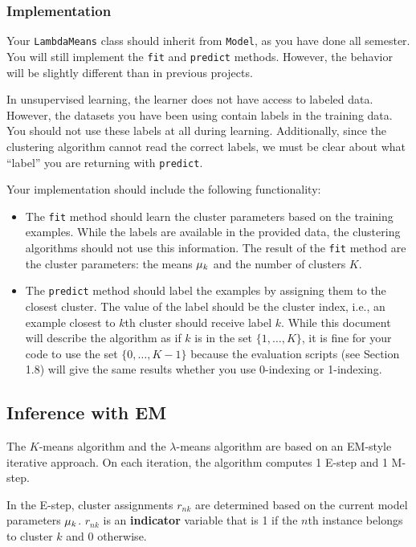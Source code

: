 \documentclass[11pt]{article}
\newcommand{\vmuk}{{\bf \mu}_k}
\newcommand{\code}[1]{{\footnotesize \tt #1}}
\begin{document}
\subsubsection{Implementation}

Your \code{LambdaMeans} class should inherit from \code{Model}, as you have done all semester. You will still implement the \code{fit} and \code{predict} methods. However, the behavior will be slightly different than in previous projects.

In unsupervised learning, the learner does not have access to labeled data. However, the datasets you have been using contain labels in the training data. You should not use these labels at all during learning. Additionally, since the clustering algorithm cannot read the correct labels, we must be clear about what ``label'' you are returning with \code{predict}.

Your implementation should include the following functionality:

\begin{itemize}
\item The \code{fit} method should learn the cluster parameters based on the training examples. While the labels are available in the provided data, the clustering algorithms should not use this information. The result of the \code{fit} method are the cluster parameters: the means $\vmuk$ and the number of clusters $K$. 
\item The \code{predict} method should label the examples by assigning them to the closest cluster.
The value of the label should be the cluster index, i.e., an example closest to $k$th cluster should receive label $k$. While this document will describe the algorithm as if $k$ is in the set $\{1,\ldots,K\}$, it is fine for your code to use the set $\{0,\ldots,K-1\}$ because the evaluation scripts (see Section 1.8) will give the same results whether you use 0-indexing or 1-indexing.
\end{itemize}

\subsection{Inference with EM}
\label{sec:EM}
The $K$-means algorithm and the $\lambda$-means algorithm are based on an EM-style iterative approach. On each iteration, the algorithm computes 1 E-step and 1 M-step.

In the E-step, cluster assignments $r_{nk}$ are determined based on the current model parameters $\vmuk$. 
$r_{nk}$ is an {\bf indicator} variable that is 1 if the $n$th instance belongs to cluster $k$ and 0 otherwise.
\end{document}
